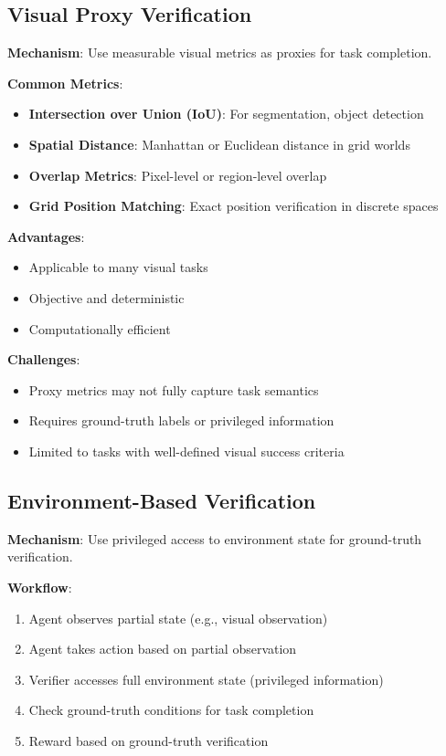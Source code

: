 \documentclass[11pt,a4paper]{article}
\begin{document}

\subsection{Visual Proxy Verification}
\label{sec:visual_proxy}

\textbf{Mechanism}: Use measurable visual metrics as proxies for task completion.

\textbf{Common Metrics}:
\begin{itemize}[leftmargin=*]
    \item \textbf{Intersection over Union (IoU)}: For segmentation, object detection
    \item \textbf{Spatial Distance}: Manhattan or Euclidean distance in grid worlds
    \item \textbf{Overlap Metrics}: Pixel-level or region-level overlap
    \item \textbf{Grid Position Matching}: Exact position verification in discrete spaces
\end{itemize}

\textbf{Advantages}:
\begin{itemize}[leftmargin=*]
    \item Applicable to many visual tasks
    \item Objective and deterministic
    \item Computationally efficient
\end{itemize}

\textbf{Challenges}:
\begin{itemize}[leftmargin=*]
    \item Proxy metrics may not fully capture task semantics
    \item Requires ground-truth labels or privileged information
    \item Limited to tasks with well-defined visual success criteria
\end{itemize}

\subsection{Environment-Based Verification}
\label{sec:env_based}

\textbf{Mechanism}: Use privileged access to environment state for ground-truth verification.

\textbf{Workflow}:
\begin{enumerate}[leftmargin=*]
    \item Agent observes partial state (e.g., visual observation)
    \item Agent takes action based on partial observation
    \item Verifier accesses full environment state (privileged information)
    \item Check ground-truth conditions for task completion
    \item Reward based on ground-truth verification
\end{enumerate}
\end{document}
